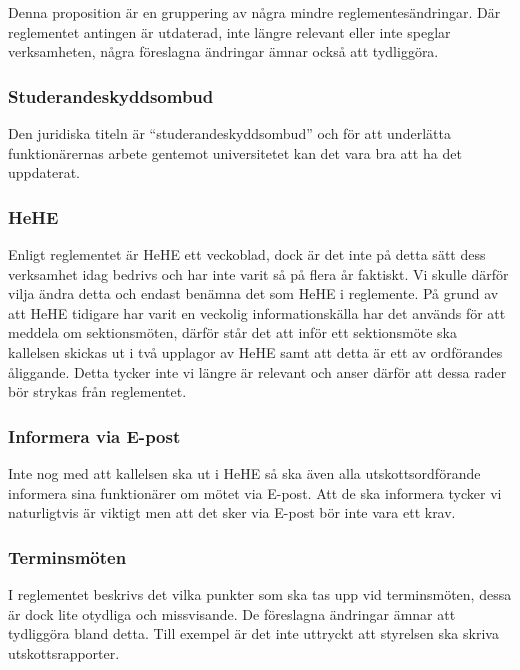 \documentclass[../_main/handlingar.tex]{subfiles}
\begin{document}

Denna proposition är en gruppering av några mindre reglementesändringar. Där reglementet antingen är utdaterad, inte längre relevant eller inte speglar verksamheten, några föreslagna ändringar ämnar också att tydliggöra.

\subsubsection{Studerandeskyddsombud}    
Den juridiska titeln är “studerandeskyddsombud” och för att underlätta funktionärernas arbete gentemot universitetet kan det vara bra att ha det uppdaterat. 

\subsubsection{HeHE}
Enligt reglementet är HeHE ett veckoblad, dock är det inte på detta sätt dess verksamhet idag bedrivs och har inte varit så på flera år faktiskt. Vi skulle därför vilja ändra detta och endast benämna det som HeHE i reglemente. På grund av att HeHE tidigare har varit en veckolig informationskälla har det används för att meddela om sektionsmöten, därför står det att inför ett sektionsmöte ska kallelsen skickas ut i två upplagor av HeHE samt att detta är ett av ordförandes åliggande. Detta tycker inte vi längre är relevant och anser därför att dessa rader bör strykas från reglementet. 

\subsubsection{Informera via E-post}
Inte nog med att kallelsen ska ut i HeHE så ska även alla utskottsordförande informera sina funktionärer om mötet via E-post. Att de ska informera tycker vi naturligtvis är viktigt men att det sker via E-post bör inte vara ett krav.

\subsubsection{Terminsmöten}
I reglementet beskrivs det vilka punkter som ska tas upp vid terminsmöten, dessa är dock lite otydliga och missvisande. De föreslagna ändringar ämnar att tydliggöra bland detta. Till exempel är det inte uttryckt att styrelsen ska skriva utskottsrapporter.  

\newpage
\end{document}
